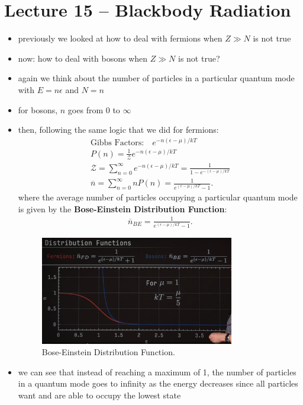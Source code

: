 \documentclass[10pt]{article}
\begin{document}
\section{Lecture 15 -- Blackbody Radiation}
\begin{itemize}
    \item previously we looked at how to deal with fermions when $Z\gg N$ is not true
    \item now: how to deal with bosons when $Z \gg N$ is not true?
    \item again we think about the number of particles in a particular quantum mode with $E = n\epsilon$ and $N = n$
    \item for bosons,  $n$ goes from 0 to $\infty$
    \item then, following the same logic that we did for fermions:
        \begin{gather*}
            \text{Gibbs Factors:} \quad e^{-n(\epsilon-\mu) / kT} \\ 
            P(n) = \frac{1}{\mathcal{Z}}e^{-n(\epsilon-\mu) / kT} \\
            \mathcal{Z} = \sum_{n=0}^{\infty} e^{-n(\epsilon-\mu) / kT} = \frac{1}{1-e^{-(\epsilon-\mu) / kT}} \\
            \overline{n} = \sum_{n=0}^{\infty} nP(n) = \frac{1}{e^{(\epsilon-\mu) / kT} - 1}
        .\end{gather*}
        where the average number of particles occupying a particular quantum mode is given by the \textbf{Bose-Einstein Distribution Function}:
        \begin{gather*}
            \overline{n}_{BE} = \frac{1}{e^{(\epsilon-\mu) / kT} - 1}
        .\end{gather*}
        \begin{figure}[H]
            \centering
            \includegraphics[width=0.8\textwidth]{boseEinstein}
            \caption{Bose-Einstein Distribution Function.}
            \label{fig:boseEinstein}
        \end{figure}
    \item we can see that instead of reaching a maximum of 1, the number of particles in a quantum mode goes to infinity as the energy decreases since all particles want and are able to occupy the lowest state
\end{itemize}
\end{document}
